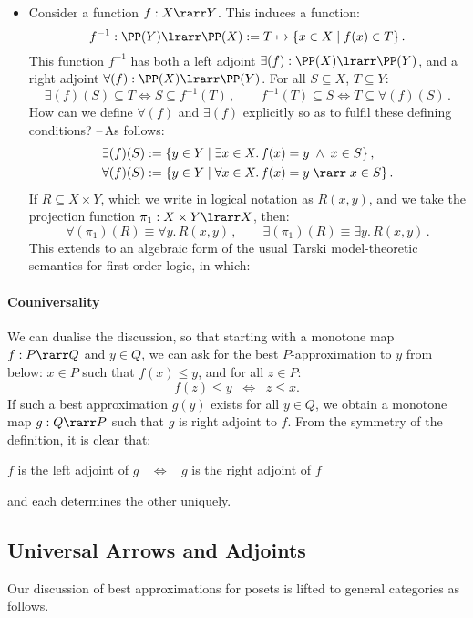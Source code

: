 \documentclass[12pt]{article}
\begin{document}
\begin{itemize}
%
\item Consider a function $f : X \rarr Y$. This induces a function:
\[ f^{-1} : \PP(Y) \lrarr \PP(X) := T \mapsto \{ x \in X \mid f(x) \in T \}\,. \]
This function $f^{-1}$ has both a left adjoint $\exists (f) : \PP(X) \lrarr \PP(Y)$, and a right adjoint $\forall (f) : \PP(X) \lrarr \PP(Y)$. For all
$S \subseteq X$, $T \subseteq Y$:
\[ \exists(f)(S) \subseteq T \iff S \subseteq f^{-1}(T)\,,\qquad  f^{-1}(T) \subseteq S \iff  T \subseteq \forall(f)(S)\,. \]
How can we define $\forall(f)$ and $\exists(f)$ explicitly so as to fulfil these defining conditions? --\,As follows:
\begin{align*}
\exists(f)(S) &:= \{ y \in Y \mid \exists x \in X. \, f(x) = y \; \wedge \; x \in S \}\,,  \\
\forall(f)(S) &:= \{ y \in Y \mid \forall x \in X. \, f(x) = y \; \rarr \; x \in S \}\,.
\end{align*}
%
If $R \subseteq X \times Y$, which we write in logical notation as $R(x, y)$, and we take the projection function $\pi_{1} : X \times Y \lrarr X$,
then:
\[ \forall(\pi_{1})(R) \equiv \forall y. \, R(x, y)\,, \qquad \exists(\pi_{1})(R) \equiv \exists y. \, R(x, y)\,. \]
%
This extends to an algebraic form of the usual Tarski model-theoretic semantics for first-order logic, in which:
\begin{center}
\end{center}
\end{itemize}

\paragraph{Couniversality}
We can dualise the discussion, so that starting with a monotone map $f : P \rarr Q$ and $y \in Q$, we can ask for the best $P$-approximation to $y$ from below: $x \in P$ such that $f(x) \leq y$, and for all $z \in P$:
\[ f(z) \leq y \;\; \Longleftrightarrow \;\; z \leq x . \]
%
If such a best approximation $g(y)$ exists for all $y \in Q$, we obtain a monotone map $g : Q \rarr P$ such that $g$ is right adjoint to $f$.
From the symmetry of the definition, it is clear that:
\begin{center}
 $f$ is the left adjoint of $g$ $\;\; \Longleftrightarrow \;\;$ $g$ is the right adjoint of $f$
\end{center}
and each determines the other uniquely.

\subsection{Universal Arrows and Adjoints}
Our discussion of best approximations for posets is lifted to general categories as follows.
\end{document}
